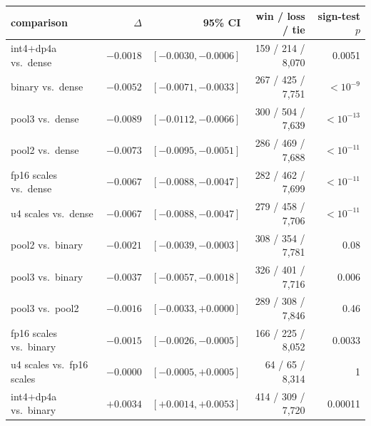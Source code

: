 \begin{tabular}{l r r r r}
\toprule
comparison & $\Delta$ \ndcg{} & 95\% CI & win / loss / tie & sign-test $p$ \\
\midrule
int4$+$dp4a vs.\ dense & $-0.0018$ & $[-0.0030, -0.0006]$ & 159 / 214 / 8,070 & 0.0051 \\
binary vs.\ dense & $-0.0052$ & $[-0.0071, -0.0033]$ & 267 / 425 / 7,751 & $<10^{-9}$ \\
pool3 vs.\ dense & $-0.0089$ & $[-0.0112, -0.0066]$ & 300 / 504 / 7,639 & $<10^{-13}$ \\
pool2 vs.\ dense & $-0.0073$ & $[-0.0095, -0.0051]$ & 286 / 469 / 7,688 & $<10^{-11}$ \\
fp16 scales vs.\ dense & $-0.0067$ & $[-0.0088, -0.0047]$ & 282 / 462 / 7,699 & $<10^{-11}$ \\
u4 scales vs.\ dense & $-0.0067$ & $[-0.0088, -0.0047]$ & 279 / 458 / 7,706 & $<10^{-11}$ \\
pool2 vs.\ binary & $-0.0021$ & $[-0.0039, -0.0003]$ & 308 / 354 / 7,781 & 0.08 \\
pool3 vs.\ binary & $-0.0037$ & $[-0.0057, -0.0018]$ & 326 / 401 / 7,716 & 0.006 \\
pool3 vs.\ pool2 & $-0.0016$ & $[-0.0033, +0.0000]$ & 289 / 308 / 7,846 & 0.46 \\
fp16 scales vs.\ binary & $-0.0015$ & $[-0.0026, -0.0005]$ & 166 / 225 / 8,052 & 0.0033 \\
u4 scales vs.\ fp16 scales & $-0.0000$ & $[-0.0005, +0.0005]$ & 64 / 65 / 8,314 & 1 \\
int4$+$dp4a vs.\ binary & $+0.0034$ & $[+0.0014, +0.0053]$ & 414 / 309 / 7,720 & 0.00011 \\
\bottomrule
\end{tabular}
